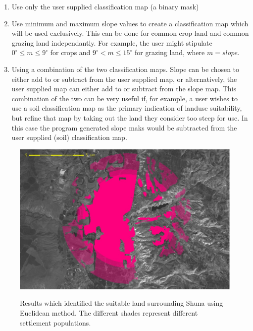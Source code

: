 \begin{enumerate} 

\item  Use only the user supplied classification map (a binary mask) 

\item  Use minimum and maximum slope values to create a classification map
which will be used exclusively.  This can be done for common crop land and
common grazing land independantly.  For example, the user might stipulate
$0^\circ \leq m \leq 9^\circ$ for crops and $9^\circ < m \leq 15^\circ$ for
grazing land, where $m=slope$.  

\item  Using a combination of the two classification maps.  Slope can be chosen
to either add to or subtract from the user supplied map, or alternatively, the
user supplied map can either add to or subtract from the slope map.  This
combination of the two can be very useful if, for example, a user wishes to use
a soil classification map as the primary indication of landuse suitability, but
refine that map by taking out the land they consider too steep for use.  In
this case the program generated slope maks would be subtracted from the user
supplied (soil) classification map.  

\end{enumerate}

  \begin{figure}[htbp] %
  \includegraphics[scale=0.225]{./images/landcatchment.jpg}
   \label{fig:landCatchment} \caption{Results which identified the suitable
         land surrounding Shuna using Euclidean method.
   The different shades represent different settlement populations.}
   \end{figure}

